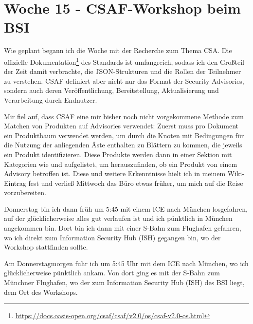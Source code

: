 \section{Woche 15 - CSAF-Workshop beim BSI} \label{sec:bericht-wo-15}



Wie geplant begann ich die Woche mit der Recherche zum Thema CSA\@.
Die offizielle Dokumentation\footnote{\url{https://docs.oasis-open.org/csaf/csaf/v2.0/os/csaf-v2.0-os.html}} des Standards ist umfangreich, sodass ich den Großteil der Zeit damit verbrachte, die JSON-Strukturen und die Rollen der Teilnehmer zu verstehen.
CSAF definiert aber nicht nur das Format der Security Advisories, sondern auch deren Veröffentlichung, Bereitstellung, Aktualisierung und Verarbeitung durch Endnutzer.

Mir fiel auf, dass CSAF eine mir bisher noch nicht vorgekommene Methode zum Matchen von Produkten auf Advisories verwendet:
Zuerst muss pro Dokument ein Produktbaum verwendet werden, um durch die Knoten mit Bedingungen für die Nutzung der anliegenden Äste enthalten zu Blättern zu kommen, die jeweils ein Produkt identifizieren.
Diese Produkte werden dann in einer Sektion mit Kategorien wie  und  aufgelistet, um herauszufinden, ob ein Produkt von einem Advisory betroffen ist.
Diese und weitere Erkenntnisse hielt ich in meinem Wiki-Eintrag fest und verließ Mittwoch das Büro etwas früher, um mich auf die Reise vorzubereiten.


Donnerstag bin ich dann früh um 5:45 mit einem ICE nach München losgefahren, auf der glücklicherweise alles gut verlaufen ist und ich pünktlich in München angekommen bin.
Dort bin ich dann mit einer S-Bahn zum Flughafen gefahren, wo ich direkt zum Information Security Hub (ISH) gegangen bin, wo der Workshop stattfinden sollte.

Am Donnerstagmorgen fuhr ich um 5:45 Uhr mit dem ICE nach München, wo ich glücklicherweise pünktlich ankam.
Von dort ging es mit der S-Bahn zum Münchner Flughafen, wo der zum Information Security Hub (ISH) des BSI liegt, dem Ort des Workshops.

